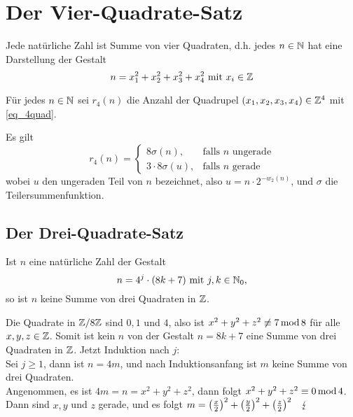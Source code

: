 \section{Der Vier-Quadrate-Satz}
\label{sec:para9}

\begin{satz} \label{satz_langrange}
	Jede natürliche Zahl ist Summe von vier Quadraten, d.h. jedes $n \in \mathbb{N}$ hat eine Darstellung der Gestalt 
	\begin{equation}
		n = x_1^2 + x_2^2 + x_3^2 + x_4^2 \text{ mit } x_i \in \mathbb{Z} \label{eq_4quad}
	\end{equation}
\end{satz}

\begin{defn}
	Für jedes $n \in \mathbb{N}$ sei $r_4(n)$ die Anzahl der Quadrupel $(x_1,x_2,x_3,x_4) \in \mathbb{Z}^4$ mit \eqref{eq_4quad}.
\end{defn}

\begin{lemma}
	Es gilt
	\begin{equation}
		r_4(n) = \begin{cases}
			8\sigma(n), & \text{falls } n \text{ ungerade} \\
			3\cdot 8 \sigma(u), & \text{falls } n \text{ gerade}
		\end{cases} \label{eq_jacobiformel}
	\end{equation}
	wobei $u$ den ungeraden Teil von $n$ bezeichnet, also $u = n \cdot 2^{-w_2(n)}$, und $\sigma$ die Teilersummenfunktion.
\end{lemma}

\subsection{Der Drei-Quadrate-Satz}

\begin{falko} \label{F10.1}
	Ist $n$ eine natürliche Zahl der Gestalt
	\begin{equation}
		n = 4^j \cdot (8k + 7) \text{ mit } j,k \in \mathbb{N}_0, \label{eq_F10.1}
	\end{equation}
	so ist $n$ keine Summe von drei Quadraten in $\mathbb{Z}$.
\end{falko}

Die Quadrate in $\mathbb{Z}/8\mathbb{Z}$ sind $0, 1$ und $4$, also ist $x^2+y^2+z^2 \not\equiv 7 \operatorname{mod} 8$ für alle $x,y,z \in \mathbb{Z}$. Somit ist kein $n$ von der Gestalt $n = 8k+7$ eine Summe von drei Quadraten in $\mathbb{Z}$. 
Jetzt Induktion nach $j$: \\
Sei $j \geq 1$, dann ist $n = 4m$, und nach Induktionsanfang ist $m$ keine Summe von drei Quadraten. \\
Angenommen, es ist $4m = n = x^2+y^2+z^2$, dann folgt $x^2+y^2+z^2 \equiv 0 \operatorname{mod} 4$. Dann sind $x,y$ und $z$ gerade, und es folgt $m = \leg{x}{2}^2 + \leg{y}{2}^2 + \leg{z}{2}^2 \quad \lightning$

